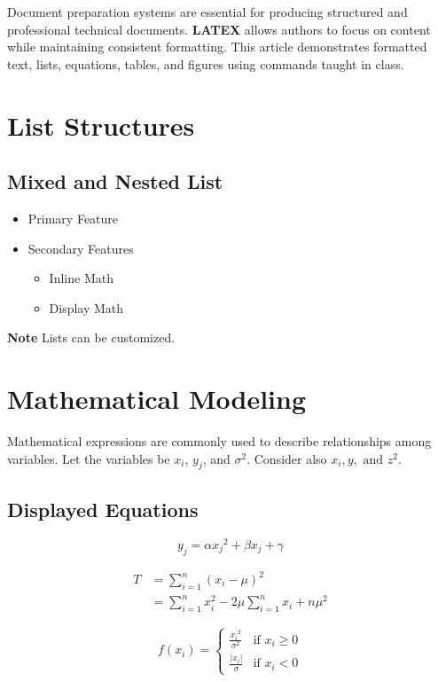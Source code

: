 \documentclass[11pt,a4paper]{article}
\theoremstyle{plain}
\theoremstyle{definition}
\theoremstyle{remark}
\begin{document}
Document preparation systems are essential for producing structured and professional technical documents. \textbf{LATEX} allows authors to focus on content while maintaining consistent formatting. This article demonstrates formatted text, lists, equations, tables, and figures using commands taught in class.

\section{List Structures}
\subsection{Mixed and Nested List}
\begin{itemize}
    \item Primary Feature
    \item Secondary Features
        \begin{itemize}
    \item[-] Inline Math
    \item[-] Display Math
        \end{itemize}
\end{itemize}

\textbf{Note} Lists can be customized.

\section{Mathematical Modeling}
\label{sec:mathmod}
Mathematical expressions are commonly used to describe relationships among
variables. Let the variables be $x_i$, $y_j$, and $\sigma^2$. Consider also
$x_i, y, \text{ and } z^2.$

\subsection{Displayed Equations}

\begin{equation}
    y_j = \alpha{x_j}^2 + \beta x_j + \gamma
\end{equation}

\begin{align*}
     T &= \sum_{i=1}^{n}(x_i - \mu)^2 \\
     &= \sum_{i=1}^{n}x_i^2 - 2\mu\sum_{i=1}^{n}x_i + n\mu^2 \tag{2}
\end{align*}

\[
f(x_i) =
\begin{cases}
    \frac{{x_i}^2}{\sigma^2} & \text{if } x_i \geq 0 \\
    \frac{|x_i|}{\sigma}  & \text{if } x_i < 0
\end{cases}
\]
\end{document}
